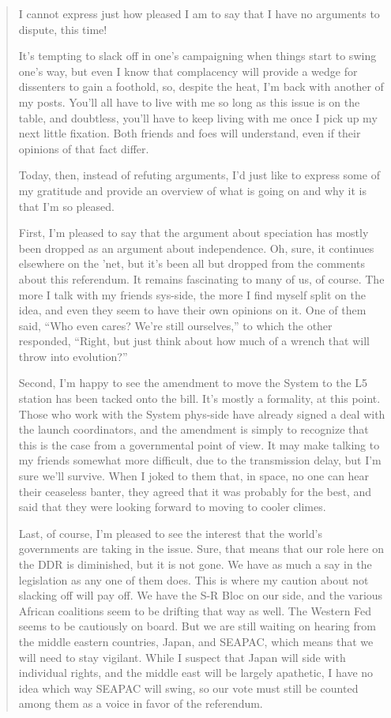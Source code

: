 \begin{quote}
I cannot express just how pleased I am to say that I have no arguments to dispute, this time!

It's tempting to slack off in one's campaigning when things start to swing one's way, but even I know that complacency will provide a wedge for dissenters to gain a foothold, so, despite the heat, I'm back with another of my posts. You'll all have to live with me so long as this issue is on the table, and doubtless, you'll have to keep living with me once I pick up my next little fixation. Both friends and foes will understand, even if their opinions of that fact differ.

Today, then, instead of refuting arguments, I'd just like to express some of my gratitude and provide an overview of what is going on and why it is that I'm so pleased.

First, I'm pleased to say that the argument about speciation has mostly been dropped as an argument about independence. Oh, sure, it continues elsewhere on the 'net, but it's been all but dropped from the comments about this referendum. It remains fascinating to many of us, of course. The more I talk with my friends sys-side, the more I find myself split on the idea, and even they seem to have their own opinions on it. One of them said, ``Who even cares? We're still ourselves,'' to which the other responded, ``Right, but just think about how much of a wrench that will throw into evolution?''

Second, I'm happy to see the amendment to move the System to the L5 station has been tacked onto the bill. It's mostly a formality, at this point. Those who work with the System phys-side have already signed a deal with the launch coordinators, and the amendment is simply to recognize that this is the case from a governmental point of view. It may make talking to my friends somewhat more difficult, due to the transmission delay, but I'm sure we'll survive. When I joked to them that, in space, no one can hear their ceaseless banter, they agreed that it was probably for the best, and said that they were looking forward to moving to cooler climes.

Last, of course, I'm pleased to see the interest that the world's governments are taking in the issue. Sure, that means that our role here on the DDR is diminished, but it is not gone. We have as much a say in the legislation as any one of them does. This is where my caution about not slacking off will pay off. We have the S-R Bloc on our side, and the various African coalitions seem to be drifting that way as well. The Western Fed seems to be cautiously on board. But we are still waiting on hearing from the middle eastern countries, Japan, and SEAPAC, which means that we will need to stay vigilant. While I suspect that Japan will side with individual rights, and the middle east will be largely apathetic, I have no idea which way SEAPAC will swing, so our vote must still be counted among them as a voice in favor of the referendum.


\end{quote}
